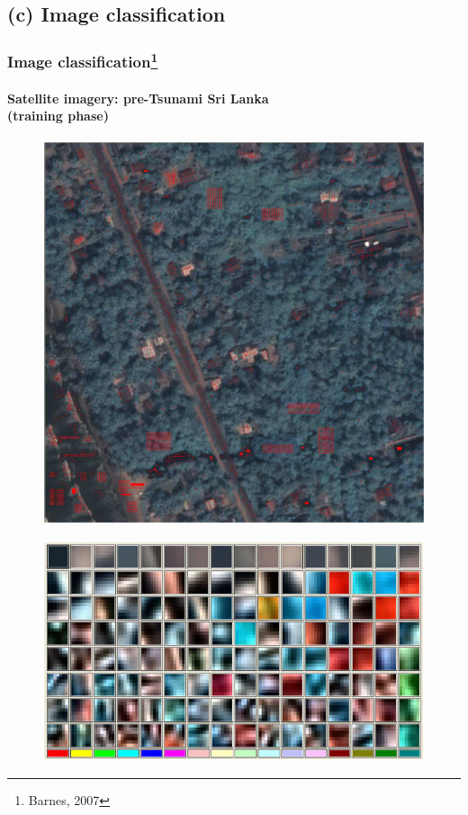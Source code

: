\subsection{(c) Image classification}
\begin{frame}
\frametitle{Image classification\footnote{Barnes, 2007}}
\framesubtitle{\small Satellite imagery: pre-Tsunami Sri Lanka \\(training phase)}
\logoCSIPCPL\mypagenum
	\begin{figure}		
		\includegraphics[height=0.3\textheight]{thesis/RVQ_SatelliteSriLanka_1_snippets.png}			
	\end{figure}
	\begin{figure}		
		\includegraphics[height=0.35\textheight]{thesis/RVQ_SatelliteSriLanka_2_codebooks.png}			
	\end{figure}
\end{frame}





